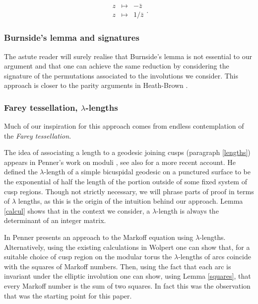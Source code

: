 \documentclass[12pt,a4paper]{amsart}
\begin{document}
$$
\begin{array}{lll} z &\mapsto& -\bar{z} \\ z &\mapsto& 1/\bar{z}
\end{array}. $$



\subsubsection{Burnside's lemma and signatures}
 The astute reader will surely realise that Burnside's lemma is not essential to our argument
 and that one can achieve the same reduction by considering the signature
 of the permutations associated to the  involutions we consider. 
 This approach is closer to the parity arguments in Heath-Brown \cite{heath}.
 
 \subsubsection{Farey tessellation, $\lambda$-lengths}

 Much of our inspiration for this approach comes from  endless
 contemplation of the \textit{Farey tessellation}.
 
 The idea of associating a length to a geodesic joining cusps
 (paragraph \ref{lengths}) appears in Penner's work on moduli
 \cite{bob},
see also \cite{spring} for a more recent account.
He defined the $\lambda$-length of a simple bicuspidal geodesic 
on a punctured
surface to be the exponential of half the 
length of the portion outside of some fixed
system of cusp regions.
Though not strictly necessary,
we will phrase parts of proof in terms of $\lambda$ lengths,
as this is the origin of the  intuition behind our approach. 
Lemma \ref{calcul} shows that in the context we consider,
a $\lambda$-length is always the determinant 
of an integer matrix.

In \cite{bob} Penner presents an approach to the Markoff equation
using $\lambda$-lengths. Alternatively,  using the existing calculations in
Wolpert \cite{saw} one can show that, for a suitable choice of cusp
region on the modular torus  the $\lambda$-lengths of arcs coincide
with the squares of Markoff numbers. Then, using the fact that each
arc is invariant under the elliptic involution one can show, using
Lemma \ref{squares}, that every Markoff number is the sum of two
squares. In fact this was the observation that was the starting
point for this paper.
 
\end{document}
